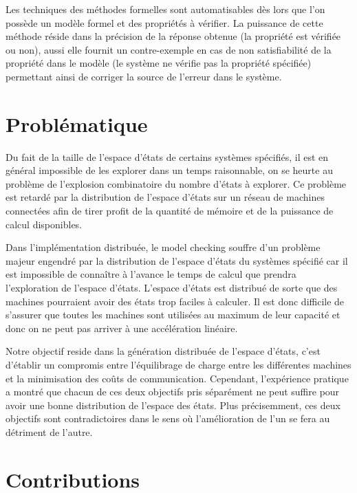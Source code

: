 Les techniques des méthodes formelles sont automatisables dès lors que l’on possède un modèle formel et des propriétés à vérifier. La puissance de cette méthode réside dans la précision de la réponse obtenue (la propriété est vérifiée ou non),  aussi elle fournit un contre-exemple en cas de non satisfiabilité de la propriété dans le modèle (le système ne vérifie pas la propriété spécifiée) permettant ainsi de corriger la source de l'erreur dans le système.

\section{Problématique}
Du fait de la taille de l'espace d'états de certains systèmes spécifiés, il est en général impossible de les explorer dans un temps raisonnable, on se heurte au problème de l'explosion combinatoire du nombre d'états à explorer. Ce problème est retardé par la distribution de l'espace d'états sur un réseau de machines connectées afin de tirer profit de la quantité de mémoire et de la puissance de calcul disponibles.

Dans l’implémentation distribuée, le model checking souffre d'un problème majeur engendré par la distribution de l'espace d'états du systèmes spécifié car il est impossible de connaître à l’avance le temps de calcul que prendra l’exploration de l'espace d'états. L'espace d'états est distribué de sorte que des machines pourraient avoir des états trop faciles à calculer. Il est donc difficile de s’assurer que toutes les machines sont utilisées au maximum de
leur capacité et donc on ne peut pas arriver à une accélération linéaire.

Notre objectif reside dans la génération distribuée de l'espace d'états, c'est d’établir un compromis entre l’équilibrage de charge entre les différentes machines et la minimisation des coûts de communication. Cependant, l’expérience pratique a montré que chacun de ces deux objectifs pris séparément ne peut suffire pour avoir une bonne distribution de l’espace des états. Plus précisemment, ces deux objectifs sont contradictoires dans le sens où l'amélioration de l'un se fera au détriment de l'autre.

\section{Contributions}

